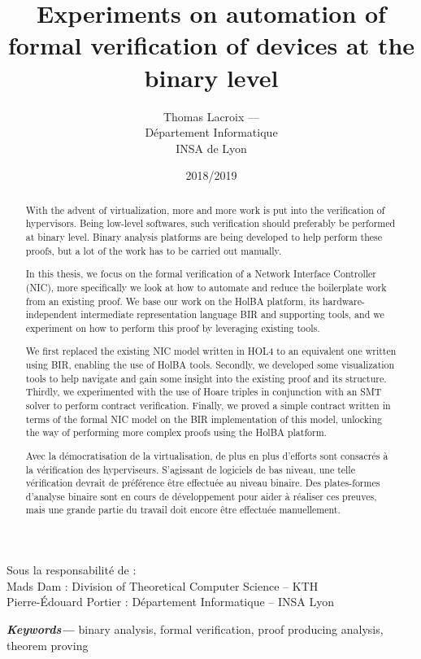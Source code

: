 \documentclass[10pt,a4paper]{article}
\title{Experiments on automation of formal verification of devices at the binary level}
\author{Thomas Lacroix --- \email{thomas.lacroix@insa-lyon.fr}\medskip\\
Département Informatique\\
INSA de Lyon}
\date{2018/2019}
\begin{document}

\maketitle
\thispagestyle{empty}

{
\noindent Sous la responsabilité de :\\
Mads Dam : Division of Theoretical Computer Science -- KTH\\
Pierre-\'Edouard Portier : Département Informatique -- INSA Lyon
}

{ %
\fontsize{9}{10.8}

\begin{abstract}
  With the advent of virtualization, more and more work is put into the verification of hypervisors. Being low-level softwares, such verification should preferably be performed at binary level. Binary analysis platforms are being developed to help perform these proofs, but a lot of the work has to be carried out manually.
  
  In this thesis, we focus on the formal verification of a Network Interface Controller (NIC), more specifically we look at how to automate and reduce the boilerplate work from an existing proof. We base our work on the HolBA platform, its hardware-independent intermediate representation language BIR and supporting tools, and we experiment on how to perform this proof by leveraging existing tools.
  
  We first replaced the existing NIC model written in HOL4 to an equivalent one written using BIR, enabling the use of HolBA tools. Secondly, we developed some visualization tools to help navigate and gain some insight into the existing proof and its structure. Thirdly, we experimented with the use of Hoare triples in conjunction with an SMT solver to perform contract verification. Finally, we proved a simple contract written in terms of the formal NIC model on the BIR implementation of this model, unlocking the way of performing more complex proofs using the HolBA platform.
\end{abstract}
{\small\textbf{\textit{Keywords---}} binary analysis, formal verification, proof producing analysis, theorem proving}

\vspace{0.6cm}

\begin{otherlanguage}{french}
  \begin{abstract}
    Avec la démocratisation de la virtualisation, de plus en plus d'efforts sont consacrés à la vérification des hyperviseurs. S'agissant de logiciels de bas niveau, une telle vérification devrait de préférence être effectuée au niveau binaire. Des plates-formes d'analyse binaire sont en cours de développement pour aider à réaliser ces preuves, mais une grande partie du travail doit encore être effectuée manuellement.


\end{abstract}
\end{otherlanguage}}
\end{document}
